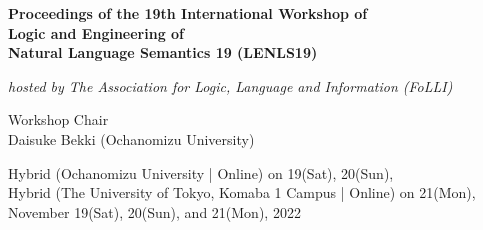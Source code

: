 \documentclass[12pt]{jarticle}
\begin{document}
\pagestyle{empty}

\vspace*{1cm}
\begin{Large}
\begin{center}
{\bf Proceedings of the 19th International Workshop of \\
     Logic and Engineering of \\Natural Language Semantics 19 (LENLS19)}
\end{center}
\end{Large}
\vspace*{1cm}
\begin{Large}
\begin{center}
{\em hosted by The Association for Logic, Language and Information (FoLLI)}
\end{center}
\end{Large}
\begin{large}
\vspace*{1cm}
\begin{center}
Workshop Chair\\ $\;$\\
Daisuke Bekki (Ochanomizu University)
\end{center}
\end{large}
\vspace*{3cm}
\vspace*{1cm}
\begin{large}
\begin{center}
Hybrid (Ochanomizu University | Online) on 19(Sat), 20(Sun), \\
Hybrid (The University of Tokyo, Komaba 1 Campus | Online) on 21(Mon), \\
November 19(Sat), 20(Sun), and 21(Mon), 2022
\end{center}
\end{large}
\vfill

\newpage

\vspace*{20cm}
\vfill
\begin{large}

\end{large}
\end{document}
